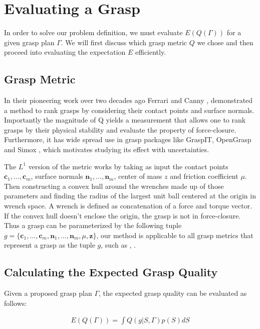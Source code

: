 \documentclass[letterpaper, 10 pt, conference]{ieeeconf}  %
\begin{document}
\section{Evaluating a Grasp}
 In order to solve our problem definition, we must evaluate $E(Q(\Gamma))$ for a given grasp plan $\Gamma$. We will first discuss which grasp metric $Q$ we chose and then proceed into evaluating the expectation $E$ efficiently. 

\subsection{Grasp Metric}
In their pioneering work over two decades ago Ferrari and Canny \cite{ferrari1992}, demonstrated a method to rank grasps by considering their contact points and surface normals. Importantly the magnitude of Q yields a measurement that allows one to rank grasps by their physical stability and evaluate the property of force-closure. Furthermore, it has wide spread use in grasp packages like GraspIT\cite{miller2004graspit}, OpenGrasp\cite{73} and Simox \cite{vahrenkamp2010simo}, which motivates studying its effect with uncertainties. 

The $L^1$ version of the metric works by taking as input the contact points $\textbf{c}_1,...,\textbf{c}_m$, surface normals $\textbf{n}_1,...,\textbf{n}_m$, center of mass $z$ and friction coefficient $\mu$. Then constructing a convex hull around the wrenches made up of those parameters and finding the radius of the largest unit ball centered at the origin in wrench space. A wrench is defined as concatenation of a force and torque vector.  If the convex hull doesn't enclose the origin, the grasp is not in force-closure. Thus a grasp can be parameterized by the following tuple $g = \lbrace \textbf{c}_1,...,\textbf{c}_m,\textbf{n}_1,...,\textbf{n}_m,\mu, \textbf{z} \rbrace$, our method is applicable to all grasp metrics that represent a grasp as the tuple $g$, such as \cite{christopoulos2007handling}, \cite{li1988task}. 

\subsection{Calculating the Expected Grasp Quality}
Given a proposed grasp plan $\Gamma$, the expected grasp quality can be evaluated as follows:

\vspace{-2ex}
\begin{align}\label{eq:shape_sampling}
E(Q(\Gamma)) = \int Q(g|S,\Gamma) p(S) dS
\end{align}
\end{document}
